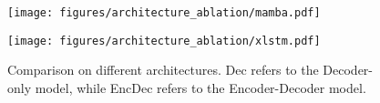 
\begin{figure}[h!]
    \centering
    \begin{minipage}{0.23\textwidth}
        \texttt{[image: figures/architecture\_ablation/mamba.pdf]}
        \vspace{-0.4cm}
    \end{minipage}
    \hfill
    \begin{minipage}{0.23\textwidth}
        \texttt{[image: figures/architecture\_ablation/xlstm.pdf]}
        \vspace{-0.4cm}
    \end{minipage}
    \caption[]{Comparison on different architectures. Dec refers to the Decoder-only model, while EncDec refers to the Encoder-Decoder model.}
    \label{fig:architecture_ablation}
\end{figure}